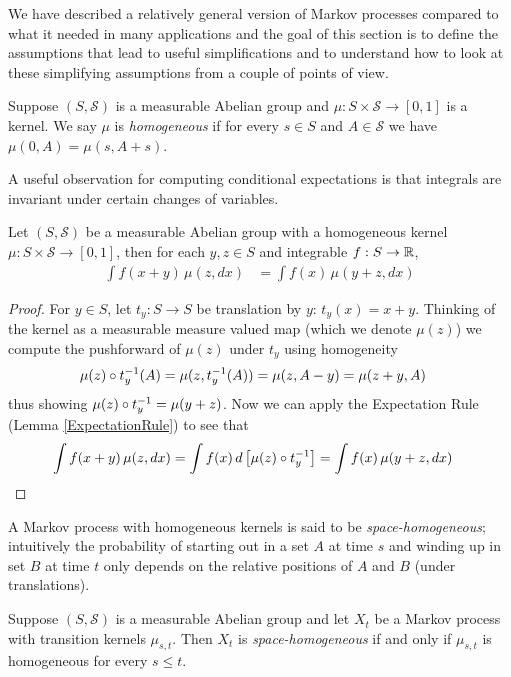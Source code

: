 We have described a relatively general version of Markov processes
compared to what it needed in many applications and the goal of this
section is to define the assumptions that lead to useful
simplifications and to understand how to look at these simplifying
assumptions from a couple of points of view.

\begin{defn}Suppose $(S, \mathcal{S})$ is a measurable Abelian group
  and $\mu : S \times \mathcal{S} \to [0,1]$ is a kernel.  We say
  $\mu$ is \emph{homogeneous} if for every $s \in S$ and
  $A\in \mathcal{S}$ we have $\mu(0, A) = \mu(s, A+s)$.
\end{defn}

A useful observation for computing conditional expectations is that
integrals are invariant under certain changes of variables.
\begin{lem}\label{HomogeneousKernelExpectationRule}Let $(S, \mathcal{S})$ be a measurable Abelian group with a
  homogeneous kernel $\mu : S \times \mathcal{S} \to [0,1]$, then for
  each $y,z \in S$ and integrable $f : S \to \reals$,
\begin{align*}
\int f(x + y) \, \mu(z, dx) &= \int f(x) \, \mu(y+z, dx)
\end{align*}
\end{lem}
\begin{proof}
For $y \in S$, let $t_y : S \to S$ be translation by $y$: $t_y(x) = x
+ y$.  Thinking of the kernel as a measurable measure
valued map (which we denote $\mu(z)$) we compute the pushforward of $\mu(z)$ under $t_y$
using homogeneity
\begin{align*}
\pushforward {t_y}{\mu(z)}(A) &= \mu(z, t_y^{-1}(A)) = \mu(z, A
- y) = \mu(z+y, A)
\end{align*}
thus showing $\pushforward {t_y}{\mu(z)} = \mu(y+z)$.
Now we can apply the Expectation Rule (Lemma \ref{ExpectationRule}) to
see that 
\begin{align*}
\int f(x + y) \, \mu(z, dx) &= \int f(x) \, d\left [ \pushforward {t_y}{\mu(z)} \right] = \int f(x) \, \mu(y+z, dx)
\end{align*}
\end{proof}

A Markov process with homogeneous kernels is said to be
\emph{space-homogeneous}; intuitively the probability of starting out
in a set $A$ at time $s$ and winding up in set $B$ at time $t$ only
depends on the relative positions of $A$ and $B$ (under translations).
\begin{defn}Suppose $(S, \mathcal{S})$ is a measurable Abelian group
  and let $X_t$ be a Markov process with transition kernels
  $\mu_{s,t}$.  Then $X_t$ is \emph{space-homogeneous} if and only if
  $\mu_{s,t}$ is homogeneous for every $s \leq t$.
\end{defn}

